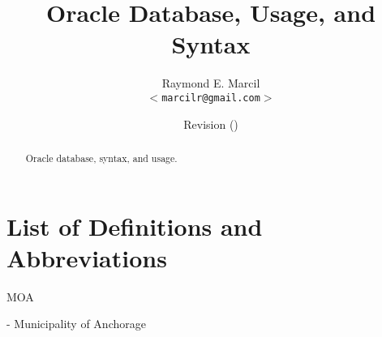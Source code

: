 \documentclass[12pt,letterpaper,dvips]{article}
\title{Oracle Database, Usage, and Syntax}
\author{Raymond E. Marcil\\
        \texttt{$<$marcilr@gmail.com$>$}
}
\date{Revision \svnInfoRevision
      \hspace{2pt}
      (\svnInfoLongDate)}
\newenvironment{itemize*}%
  {\begin{itemize}%
    \setlength{\itemsep}{0pt}%
    \setlength{\parsep}{0pt}}%
  {\end{itemize}}
\begin{document}
\maketitle

\begin{abstract}
     Oracle database, syntax, and usage.

\end{abstract}

\vspace{2.0in}


\newpage
\tableofcontents

\newpage
\listoffigures
\listoftables


\newpage
\setcounter{secnumdepth}{0}
\section{List of Definitions and Abbreviations}
\begin{itemize*}
  \item{\begin{bf}MOA\end{bf}} - Municipality of Anchorage

\end{itemize*}


\newpage
\end{document}
